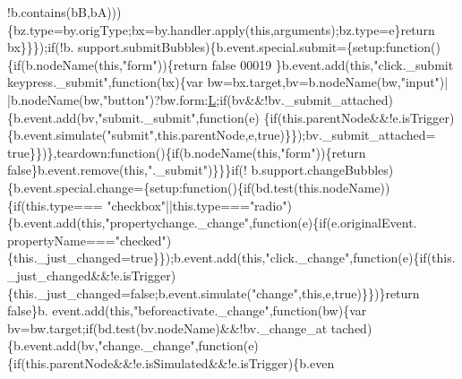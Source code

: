 \begin{DoxyCode}
      !b.contains(bB,bA)))\{bz.type=by.origType;bx=by.handler.apply(\textcolor{keyword}{this},arguments);bz.type=e\}\textcolor{keywordflow}{return} bx\}\}\});\textcolor{keywordflow}{if}(!b.
      support.submitBubbles)\{b.event.special.submit=\{setup:\textcolor{keyword}{function}()\{\textcolor{keywordflow}{if}(b.nodeName(\textcolor{keyword}{this},\textcolor{stringliteral}{"form"}))\{\textcolor{keywordflow}{return} \textcolor{keyword}{false}
00019 \}b.event.add(\textcolor{keyword}{this},\textcolor{stringliteral}{"click.\_submit keypress.\_submit"},\textcolor{keyword}{function}(bx)\{var bw=bx.target,bv=b.nodeName(bw,\textcolor{stringliteral}{"input"})|
      |b.nodeName(bw,\textcolor{stringliteral}{"button"})?bw.form:\hyperlink{jquery_8js_a38ee4c0b5f4fe2a18d0c783af540d253}{L};\textcolor{keywordflow}{if}(bv&&!bv.\_submit\_attached)\{b.event.add(bv,\textcolor{stringliteral}{"submit.\_submit"},\textcolor{keyword}{function}(e)
      \{\textcolor{keywordflow}{if}(this.parentNode&&!e.isTrigger)\{b.event.simulate(\textcolor{stringliteral}{"submit"},this.parentNode,e,true)\}\});bv.\_submit\_attached=\textcolor{keyword}{
      true}\}\})\},teardown:\textcolor{keyword}{function}()\{\textcolor{keywordflow}{if}(b.nodeName(\textcolor{keyword}{this},\textcolor{stringliteral}{"form"}))\{\textcolor{keywordflow}{return} \textcolor{keyword}{false}\}b.event.remove(\textcolor{keyword}{this},\textcolor{stringliteral}{".\_submit"})\}\}\}\textcolor{keywordflow}{if}(!
      b.support.changeBubbles)\{b.event.special.change=\{setup:\textcolor{keyword}{function}()\{\textcolor{keywordflow}{if}(bd.test(\textcolor{keyword}{this}.nodeName))\{\textcolor{keywordflow}{if}(this.type===\textcolor{stringliteral}{
      "checkbox"}||this.type===\textcolor{stringliteral}{"radio"})\{b.event.add(\textcolor{keyword}{this},\textcolor{stringliteral}{"propertychange.\_change"},\textcolor{keyword}{function}(e)\{\textcolor{keywordflow}{if}(e.originalEvent.
      propertyName===\textcolor{stringliteral}{"checked"})\{this.\_just\_changed=true\}\});b.event.add(\textcolor{keyword}{this},\textcolor{stringliteral}{"click.\_change"},\textcolor{keyword}{function}(e)\{\textcolor{keywordflow}{if}(this.
      \_just\_changed&&!e.isTrigger)\{this.\_just\_changed=false;b.event.simulate(\textcolor{stringliteral}{"change"},this,e,true)\}\})\}\textcolor{keywordflow}{return} \textcolor{keyword}{false}\}b.
      event.add(\textcolor{keyword}{this},\textcolor{stringliteral}{"beforeactivate.\_change"},\textcolor{keyword}{function}(bw)\{var bv=bw.target;if(bd.test(bv.nodeName)&&!bv.\_change\_at
      tached)\{b.event.add(bv,\textcolor{stringliteral}{"change.\_change"},function(e)\{if(this.parentNode&&!e.isSimulated&&!e.isTrigger)\{b.even

\end{DoxyCode}
